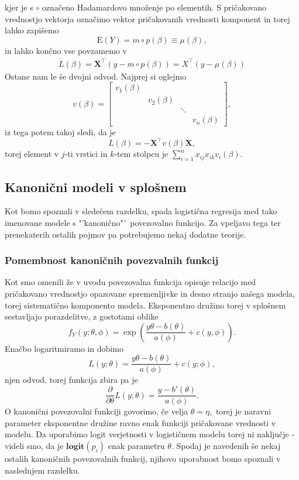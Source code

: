 \documentclass[12pt,a4paper]{amsart}
\theoremstyle{definition} %
\theoremstyle{plain} %
\begin{document}
kjer je s $\circ$ označeno Hadamardovo množenje po elementih.
S pričakovano vrednostjo vektorja označimo vektor pričakovanih vrednosti komponent in torej lahko zapišemo
\begin{equation}
    \mathrm{E}(Y) = m \circ p(\beta) \equiv \mu(\beta),
\end{equation}
in lahko končno vse povzamemo v
\begin{align}\label{prvi}
    \dot{L}(\beta) = \mathbf{X}^\top(y - m \circ p(\beta)) = X^\top(y - \mu(\beta))
\end{align}
Ostane nam le še dvojni odvod. Najprej si oglejmo
\[
    v(\beta) = \begin{bmatrix}
        v_{1}(\beta)  & & &\\
        & v_{2}(\beta) & & \\
        & & \ddots & \\
        & & & v_{n}(\beta)
    \end{bmatrix},
\]
iz tega potem takoj sledi, da je
\begin{equation} \label{drugi}
    \ddot{L}(\beta) = -\mathbf{X}^\top v(\beta)\mathbf{X},
\end{equation}
torej element v $j$-ti vrstici in $k$-tem stolpcu je $\sum_{i=1}^{n}x_{ij}x_{ik}v_{i}(\beta).$

\subsection{Kanonični modeli v splošnem}
Kot bomo spoznali v sledečem razdelku, spada logistična regresija med tako imenovane modele s "'kanonično"` povezovalno funkcijo. 
Za vpeljavo tega ter prenekaterih ostalih pojmov pa potrebujemo nekaj dodatne teorije.

\subsubsection{Pomembnost kanoničnih povezvalnih funkcij}\label{kan}
Kot smo omenili že v uvodu povezovalna funkcija opisuje relacijo med pričakovano vrednostjo opazovane spremenljivke in desno stranjo našega modela, torej
sistematično komponento modela. Eksponentno družino torej v splošnem sestavljajo porazdelitve, z gostotami oblike
\[
    f_{Y}(y; \theta, \phi) = \exp{\left(\frac{y\theta - b(\theta)}{a(\phi)} + c(y, \phi)\right)}.
\]
Enačbo logaritmiramo in dobimo
\[
    L(y;\theta) = \frac{y\theta-b(\theta)}{a(\phi)} + c(y;\phi),
\]
njen odvod, torej funkcija zbira pa je 
\[
    \frac{\partial}{\partial \theta} L(y;\theta) = \frac{y-b'(\theta)}{a(\phi)}.
\]
O kanonični povezovalni funkciji govorimo, če velja $\theta=\eta,$ torej je naravni parameter eksponentne družine ravno enak funkciji pričakovane vrednosti v modelu.
Da uporabimo logit verjetnosti v logističnem modelu torej ni naključje - videli smo, da je $\textbf{logit}(p_{i})$ enak parametru $\theta.$ Spodaj je navedenih še nekaj ostalih
kanoničnih povezovalnih funkcij, njihovo uporabnost bomo spoznali v naslednjem razdelku.
\end{document}
